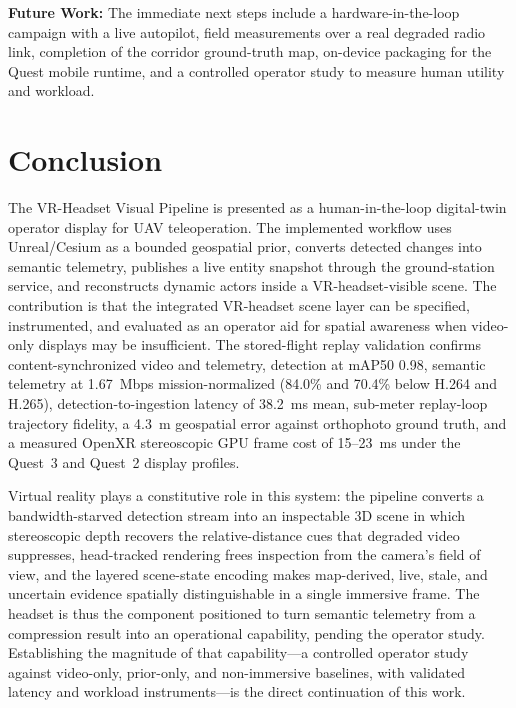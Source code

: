 \documentclass[fleqn]{VRIH2025}
\begin{document}
\textbf{Future Work:} The immediate next steps include a hardware-in-the-loop campaign with a live autopilot, field measurements over a real degraded radio link, completion of the corridor ground-truth map, on-device packaging for the Quest mobile runtime, and a controlled operator study to measure human utility and workload.

\section{Conclusion}

The VR-Headset Visual Pipeline is presented as a human-in-the-loop digital-twin operator display for UAV teleoperation. The implemented workflow uses Unreal/Cesium as a bounded geospatial prior, converts detected changes into semantic telemetry, publishes a live entity snapshot through the ground-station service, and reconstructs dynamic actors inside a VR-headset-visible scene. The contribution is that the integrated VR-headset scene layer can be specified, instrumented, and evaluated as an operator aid for spatial awareness when video-only displays may be insufficient. The stored-flight replay validation confirms content-synchronized video and telemetry, detection at mAP50 0.98, semantic telemetry at 1.67~Mbps mission-normalized (84.0\% and 70.4\% below H.264 and H.265), detection-to-ingestion latency of 38.2~ms mean, sub-meter replay-loop trajectory fidelity, a 4.3~m geospatial error against orthophoto ground truth, and a measured OpenXR stereoscopic GPU frame cost of 15--23~ms under the Quest~3 and Quest~2 display profiles.

Virtual reality plays a constitutive role in this system: the pipeline converts a bandwidth-starved detection stream into an inspectable 3D scene in which stereoscopic depth recovers the relative-distance cues that degraded video suppresses, head-tracked rendering frees inspection from the camera's field of view, and the layered scene-state encoding makes map-derived, live, stale, and uncertain evidence spatially distinguishable in a single immersive frame. The headset is thus the component positioned to turn semantic telemetry from a compression result into an operational capability, pending the operator study. Establishing the magnitude of that capability---a controlled operator study against video-only, prior-only, and non-immersive baselines, with validated latency and workload instruments---is the direct continuation of this work.
\end{document}
